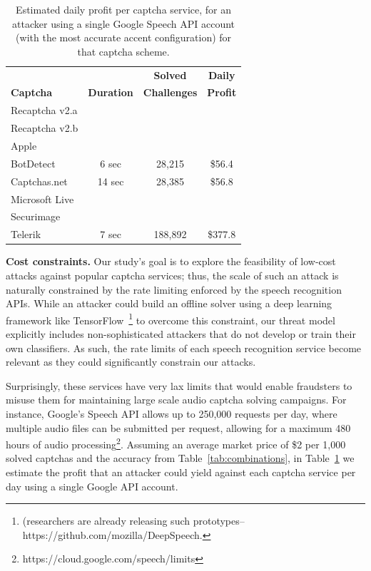 \begin{table}[t]
\centering
\caption{Estimated daily profit per captcha service, for an attacker using a single Google Speech API account
(with the most accurate accent configuration) for that captcha scheme.}
\begin{tabular}{lccc}
\toprule
& & \textbf{Solved} & \textbf{Daily} \\
\textbf{Captcha}&  \textbf{Duration} & \textbf{Challenges} & \textbf{Profit} \\
\hline
Recaptcha v2.a & & & \\
\rowcolor{Gray}
Recaptcha v2.b & & & \\
Apple  & & & \\
\rowcolor{Gray}
BotDetect  & 6 sec & 28,215 & \$56.4 \\
Captchas.net & 14 sec & 28,385 & \$56.8 \\
\rowcolor{Gray}
Microsoft Live & & & \\
Securimage & & & \\
\rowcolor{Gray}
Telerik & 7 sec & 188,892 & \$377.8 \\
\bottomrule
\end{tabular}
\label{tab:money}
\end{table}

\textbf{Cost constraints.} Our study's goal is to explore the feasibility of low-cost attacks 
against popular captcha services; thus, the scale of such an attack is naturally constrained by the rate
limiting enforced by the speech recognition APIs. While an attacker could build an offline solver
using a deep learning framework like TensorFlow~\cite{abadi2016tensorflow}\footnote{(researchers are already
releasing such prototypes--{https://github.com/mozilla/DeepSpeech}.} to overcome this constraint,
our threat model explicitly includes non-sophisticated attackers that do not develop or train their own 
classifiers. As such, the rate limits of each speech recognition service become relevant as they could significantly 
constrain our attacks. 

Surprisingly, these services have very lax limits that would enable fraudsters to misuse
them for maintaining large scale audio captcha solving campaigns. For instance, Google's Speech API allows up
to 250,000 requests per day, where multiple audio files can be submitted per request, allowing for a maximum 
480 hours of audio processing\footnote{https://cloud.google.com/speech/limits}. Assuming an average 
market price of \$2 per 1,000 solved captchas and the accuracy from Table~\ref{tab:combinations}, 
in Table~\ref{tab:money} we estimate the profit that an attacker could yield against each captcha service
per day using a single Google API account.

